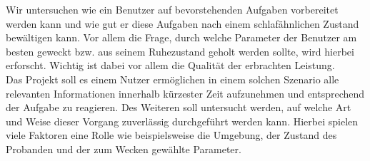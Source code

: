 Wir untersuchen wie ein Benutzer auf bevorstehenden Aufgaben vorbereitet werden kann und wie gut er diese Aufgaben nach einem schlafähnlichen Zustand bewältigen kann. 
Vor allem die Frage, durch welche Parameter der Benutzer am besten geweckt bzw. aus seinem Ruhezustand geholt werden sollte, wird hierbei erforscht. Wichtig ist dabei vor allem die Qualität der erbrachten Leistung.\\
Das Projekt \projectName soll es einem Nutzer ermöglichen in einem solchen Szenario alle relevanten Informationen innerhalb kürzester Zeit aufzunehmen und entsprechend der Aufgabe zu reagieren. Des Weiteren soll untersucht werden, auf welche Art und Weise dieser Vorgang zuverlässig durchgeführt werden kann. Hierbei spielen viele Faktoren eine Rolle wie beispielsweise die Umgebung, der Zustand des Probanden und der zum Wecken gewählte Parameter.
